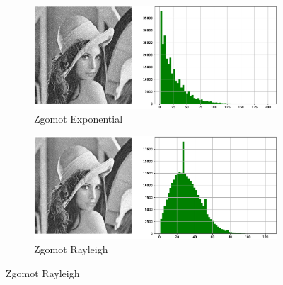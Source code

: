 \documentclass[12pt]{article}
\begin{document}
\begin{figure}[h!]
    \begin{subfigure}{0.49\textwidth}
        \centering
        \includegraphics[width=\textwidth]{images/Exponential_plot.eps}
        \caption{Zgomot Exponential}
        \label{fig:img8}
    \end{subfigure}
	\hspace{10pt} 
    \begin{subfigure}{0.49\textwidth}
        \centering
        \includegraphics[width=\textwidth]{images/Rayleigh_plot.eps}
        \caption{Zgomot Rayleigh}
        \label{fig:img9}
    \end{subfigure}
    \vspace{10pt} 


\end{figure}
\end{document}
